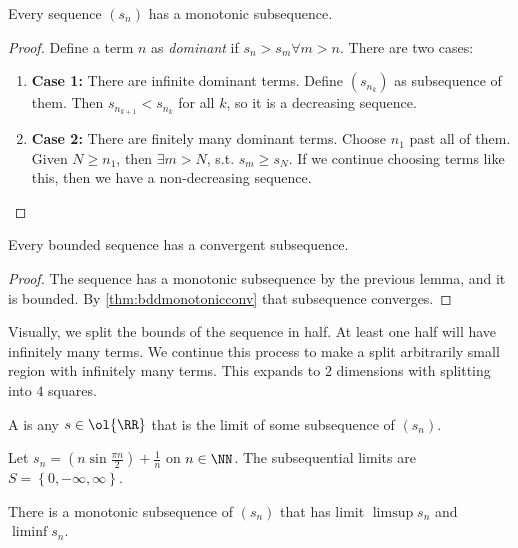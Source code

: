 \documentclass[11pt]{scrartcl}
\numberwithin{equation}{section}
\begin{document}
\begin{lemma}
    Every sequence $(s_n)$ has a monotonic subsequence.
\end{lemma}
\begin{proof}
    Define a term $n$ as \textit{dominant} if $s_n>s_m\forall m > n$.
    There are two cases: 
    \begin{enumerate}
        \item \textbf{Case 1:} There are infinite dominant terms.
        Define $(s_{n_k})$ as subsequence of them. Then $s_{n_{k+1}} < s_{n_k}$ for all $k$, so it is a decreasing sequence.
        \item \textbf{Case 2:} There are finitely many dominant terms.
        Choose $n_1$ past all of them. Given $N \geq n_1$, then 
        $\exists m > N$, s.t. $s_m\geq s_N$.
        If we continue choosing terms like this, then we have a 
        non-decreasing sequence. \qedhere
    \end{enumerate}
\end{proof}
\begin{theorem}
    \label{thm:bwt}
    Every bounded sequence has a convergent subsequence.
\end{theorem}
\begin{proof}
    The sequence has a monotonic subsequence by the previous lemma,
    and it is bounded. By \cref{thm:bddmonotonicconv} that subsequence 
    converges.
\end{proof}

Visually, we split the bounds of the sequence in half. At least one half 
will have infinitely many terms. We continue this process 
to make a split arbitrarily small region with infinitely many terms.
This expands to $2$ dimensions with splitting into $4$ squares. 

\begin{definition}
    A  is any $s\in\ol{\RR}$ 
    that is the limit of some subsequence of $(s_n)$.
\end{definition}

\begin{example}
    Let $s_n = \left( n \sin\frac{\pi n}{2} \right)+ \frac{1}{n}$
    on $n\in\NN$. The subsequential limits are 
    $S = \left\{0,-\infty, \infty\right\}$.
\end{example}

\begin{proposition}
    There is a monotonic subsequence of $(s_n)$ that has limit
    $\limsup s_n$ and $\liminf s_n$.
\end{proposition}
\end{document}
